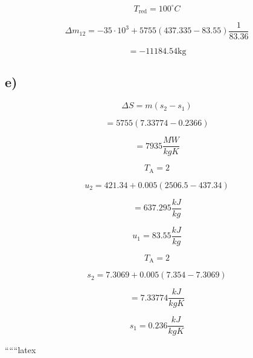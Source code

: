 \begin{equation}
T_{\text{red}} = 100^\circ C
\end{equation}

\begin{equation}
\Delta m_{12} = -35 \cdot 10^3 + 5755 (437.335 - 83.55) \frac{1}{83.36}
\end{equation}

\begin{equation}
= -11184.54 \text{kg}
\end{equation}

\subsection*{e)}

\begin{equation}
\Delta S = m (s_2 - s_1)
\end{equation}

\begin{equation}
= 5755 (7.33774 - 0.2366)
\end{equation}

\begin{equation}
= 7935 \frac{MW}{kgK}
\end{equation}

\begin{equation}
T_{\text{A}} = 2
\end{equation}

\begin{equation}
u_2 = 421.34 + 0.005 (2506.5 - 437.34)
\end{equation}

\begin{equation}
= 637.295 \frac{kJ}{kg}
\end{equation}

\begin{equation}
u_1 = 83.55 \frac{kJ}{kg}
\end{equation}

\begin{equation}
T_{\text{A}} = 2
\end{equation}

\begin{equation}
s_2 = 7.3069 + 0.005 (7.354 - 7.3069)
\end{equation}

\begin{equation}
= 7.33774 \frac{kJ}{kgK}
\end{equation}

\begin{equation}
s_1 = 0.236 \frac{kJ}{kgK}
\end{equation}

``````latex


